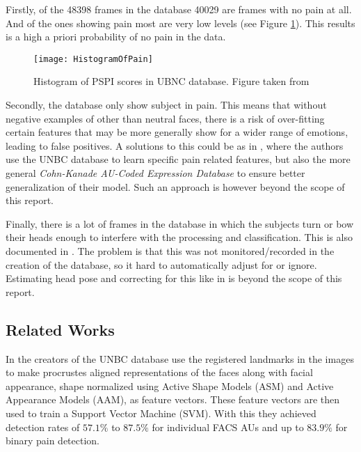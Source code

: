 \documentclass[Main]{subfiles}
\begin{document}
			Firstly, of the 48398 frames in the database 40029 are frames with no pain at all.
			And of the ones showing pain most are very low levels (see Figure \ref{fig:HistogramOfPain}).
			This results is a high a priori probability of no pain in the data.

			\begin{figure}[H]
				\centering 
				\texttt{[image: HistogramOfPain]}
				\caption{
					Histogram of PSPI scores in UBNC database. 
					Figure taken from \cite{Kaltwang2012}
					}
				\label{fig:HistogramOfPain}
			\end{figure}

			Secondly, the database only show subject in pain.
			This means that without negative examples of other than neutral faces, there is a risk of over-fitting certain features that may be more generally show for a wider range of emotions, leading to false positives.
			A solutions to this could be as in \cite{florealearning}, where the authors use the UNBC database to learn specific pain related features, but also the more general \emph{Cohn-Kanade AU-Coded Expression Database} \cite{Kanade2000} to ensure better generalization of their model.
			Such an approach is however beyond the scope of this report.

			Finally, there is a lot of frames in the database in which the subjects turn or bow their heads enough to interfere with the processing and classification.
			This is also documented in \cite{Lucey2012}.
			The problem is that this was not monitored/recorded in the creation of the database, so it hard to automatically adjust for or ignore.
			Estimating head pose and correcting for this like in  is beyond the scope of this report.





	\subsection{Related Works} %
		\label{sub:related_works}	


		
		In \cite{Lucey2011} the creators of the UNBC database use the registered landmarks in the images to make procrustes aligned representations of the faces along with facial appearance, shape normalized using Active Shape Models (ASM) and Active Appearance Models (AAM), as feature vectors.
		These feature vectors are then used to train a Support Vector Machine (SVM).
		With this they achieved detection rates of $57.1\%$ to $87.5\%$ for individual FACS AUs and up to $83.9\%$ for binary pain detection.
\end{document}

